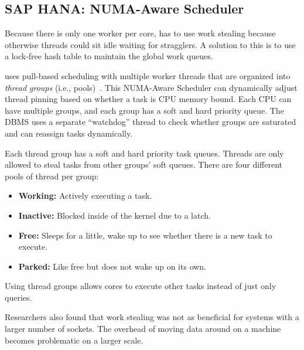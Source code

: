\documentclass[11pt]{article}
\begin{document}
\subsection*{SAP HANA: NUMA-Aware Scheduler}
Because there is only one worker per core,  has to use work stealing because otherwise 
threads could sit idle waiting for stragglers. A solution to this is to use a lock-free hash table 
to maintain the global work queues.

 uses pull-based scheduling with multiple worker threads that are organized into 
\textit{thread groups} (i.e., pools)~\cite{10.14778/2824032.2824043}. This NUMA-Aware Scheduler 
can dynamically adjust thread pinning based on whether a task is CPU memory bound. Each CPU can have 
multiple groups, and each group has a soft and hard priority queue. The DBMS uses a separate 
``watchdog'' thread to check whether groups are saturated and can reassign tasks dynamically.

Each thread group has a soft and hard priority task queues. Threads are only allowed to steal tasks 
from other groups' soft queues. There are four different pools of thread per group:

\begin{itemize}
    \item \textbf{Working:}
     Actively executing a task.
     
     \item \textbf{Inactive:}
     Blocked inside of the kernel due to a latch.
 
     \item \textbf{Free:}
     Sleeps for a little, wake up to see whether there is a new task to execute.
 
     \item \textbf{Parked:}
     Like free but does not wake up on its own.
\end{itemize}

Using thread groups allows cores to execute other tasks instead of just only queries.

Researchers also found that work stealing was not as beneficial for systems with a 
larger number of sockets. The overhead of moving data around on a machine becomes problematic on a 
larger scale.

\end{document}
